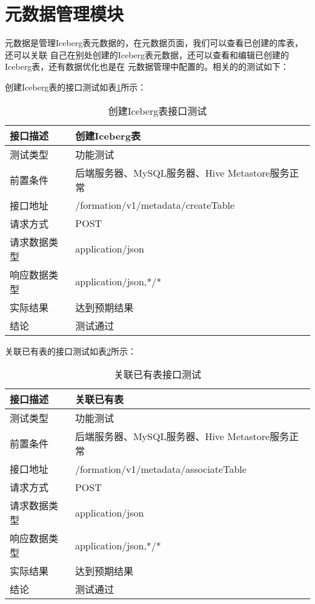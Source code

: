 \section{元数据管理模块}

元数据是管理Iceberg表元数据的，在元数据页面，我们可以查看已创建的库表，还可以关联
自己在别处创建的Iceberg表元数据，还可以查看和编辑已创建的Iceberg表，还有数据优化也是在
元数据管理中配置的。相关的的测试如下：

创建Iceberg表的接口测试如表\ref{tab:exampletable4}所示：

\begin{table}[H]
  \centering
  \caption{创建Iceberg表接口测试}
  \label{tab:exampletable4}
  \begin{tabular}{ll}
    \toprule
    接口描述         & 创建Iceberg表         \\
    \midrule
    测试类型         & 功能测试         \\
    前置条件         & 后端服务器、MySQL服务器、Hive Metastore服务正常         \\
    接口地址       & /formation/v1/metadata/createTable        \\
    请求方式         & POST      \\
    请求数据类型         & application/json     \\
    响应数据类型         & application/json,*/*           \\
    实际结果         & 达到预期结果           \\
    结论            & 测试通过           \\
    \bottomrule
  \end{tabular}
\end{table}

关联已有表的接口测试如表\ref{tab:exampletable5}所示：

\begin{table}[H]
  \centering
  \caption{关联已有表接口测试}
  \label{tab:exampletable5}
  \begin{tabular}{ll}
    \toprule
    接口描述         & 关联已有表         \\
    \midrule
    测试类型         & 功能测试         \\
    前置条件         & 后端服务器、MySQL服务器、Hive Metastore服务正常         \\
    接口地址       & /formation/v1/metadata/associateTable        \\
    请求方式         & POST      \\
    请求数据类型         & application/json     \\
    响应数据类型         & application/json,*/*           \\
    实际结果         & 达到预期结果           \\
    结论            & 测试通过           \\
    \bottomrule
  \end{tabular}
\end{table}


